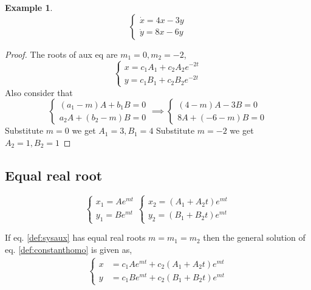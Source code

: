 \documentclass[oneside,11pt,pdftex,final]{book}%
\numberwithin{equation}{section}
\newtheorem{example}[theorem]{Example}
\numberwithin{section}{chapter}
\numberwithin{equation}{chapter}
\begin{document}
\begin{example}
	\[ \begin{cases}
		\dot{x}=4x-3y\\
		\dot{y}=8x-6y
	\end{cases} \]
\end{example}
\begin{proof}
	The roots of aux eq are $ m_1=0, m_2=-2 $,
	\[ \begin{cases}
		x=c_1A_1+c_2A_2e^{-2t}\\
		y=c_1B_1+c_2B_2e^{-2t}
	\end{cases} \]
	Also consider that
	\[ \begin{cases}
		(a_1-m)A+b_1B=0\\
		a_2A+(b_2-m)B=0
	\end{cases} \implies 
	\begin{cases}
		(4-m)A-3B=0\\
		8A+(-6-m)B=0
	\end{cases}\]
Substitute $ m=0 $ we get $ A_1=3,B_1=4 $
Substitute $ m=-2 $ we get $ A_2= 1, B_2=1$
\end{proof}

\subsection{Equal real root}
\[ \begin{cases}
	x_1=Ae^{mt}\\
	y_1=Be^{mt}
\end{cases} \begin{cases}
x_2=(A_1+A_2t)e^{mt}\\
y_2=(B_1+B_2t)e^{mt}
\end{cases}\]

If eq. \ref{def:sysaux} has equal real roots $m= m_1=m_2 $ then the general solution of eq. \ref{def:constanthomo} is given as,
\begin{align*}
	\begin{cases}
		x&=c_1Ae^{mt}+c_2(A_1+A_2t)e^{mt}\\
		y&=c_1Be^{mt}+c_2(B_1+B_2t)e^{mt}
	\end{cases}
\end{align*}
\end{document}
